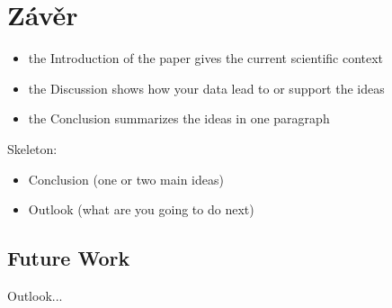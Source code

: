 \chapter{Závěr} \label{chap:conclusion}
\begin{itemize}
    \item the Introduction of the paper gives the current scientific context
    \item the Discussion shows how your data lead to or support the ideas
    \item the Conclusion summarizes the ideas in one paragraph
\end{itemize}
Skeleton:
\begin{itemize}
    \item Conclusion (one or two main ideas)
    \item Outlook (what are you going to do next)  
\end{itemize}


\section{Future Work} \label{sec:future_work}
Outlook...